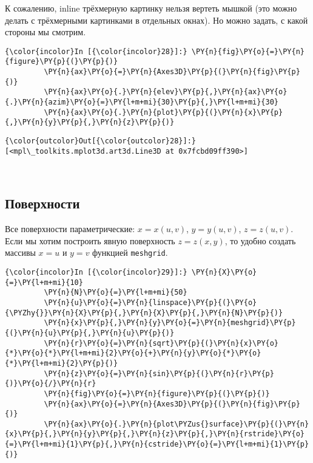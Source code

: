    К сожалению, inline трёхмерную картинку нельзя вертеть мышкой (это можно
делать с трёхмерными картинками в отдельных окнах). Но можно задать, с
какой стороны мы смотрим.

    \begin{Verbatim}[commandchars=\\\{\}]
{\color{incolor}In [{\color{incolor}28}]:} \PY{n}{fig}\PY{o}{=}\PY{n}{figure}\PY{p}{(}\PY{p}{)}
         \PY{n}{ax}\PY{o}{=}\PY{n}{Axes3D}\PY{p}{(}\PY{n}{fig}\PY{p}{)}
         \PY{n}{ax}\PY{o}{.}\PY{n}{elev}\PY{p}{,}\PY{n}{ax}\PY{o}{.}\PY{n}{azim}\PY{o}{=}\PY{l+m+mi}{30}\PY{p}{,}\PY{l+m+mi}{30}
         \PY{n}{ax}\PY{o}{.}\PY{n}{plot}\PY{p}{(}\PY{n}{x}\PY{p}{,}\PY{n}{y}\PY{p}{,}\PY{n}{z}\PY{p}{)}
\end{Verbatim}

            \begin{Verbatim}[commandchars=\\\{\}]
{\color{outcolor}Out[{\color{outcolor}28}]:} [<mpl\_toolkits.mplot3d.art3d.Line3D at 0x7fcbd09ff390>]
\end{Verbatim}
        
    \begin{center}
    \end{center}
    { \hspace*{\fill} \\}
    
\subsection{Поверхности}
\label{matplotlib9}

Все поверхности параметрические: \(x=x(u,v)\), \(y=y(u,v)\),
\(z=z(u,v)\). Если мы хотим построить явную поверхность \(z=z(x,y)\), то
удобно создать массивы \(x=u\) и \(y=v\) функцией \texttt{meshgrid}.

    \begin{Verbatim}[commandchars=\\\{\}]
{\color{incolor}In [{\color{incolor}29}]:} \PY{n}{X}\PY{o}{=}\PY{l+m+mi}{10}
         \PY{n}{N}\PY{o}{=}\PY{l+m+mi}{50}
         \PY{n}{u}\PY{o}{=}\PY{n}{linspace}\PY{p}{(}\PY{o}{\PYZhy{}}\PY{n}{X}\PY{p}{,}\PY{n}{X}\PY{p}{,}\PY{n}{N}\PY{p}{)}
         \PY{n}{x}\PY{p}{,}\PY{n}{y}\PY{o}{=}\PY{n}{meshgrid}\PY{p}{(}\PY{n}{u}\PY{p}{,}\PY{n}{u}\PY{p}{)}
         \PY{n}{r}\PY{o}{=}\PY{n}{sqrt}\PY{p}{(}\PY{n}{x}\PY{o}{*}\PY{o}{*}\PY{l+m+mi}{2}\PY{o}{+}\PY{n}{y}\PY{o}{*}\PY{o}{*}\PY{l+m+mi}{2}\PY{p}{)}
         \PY{n}{z}\PY{o}{=}\PY{n}{sin}\PY{p}{(}\PY{n}{r}\PY{p}{)}\PY{o}{/}\PY{n}{r}
         \PY{n}{fig}\PY{o}{=}\PY{n}{figure}\PY{p}{(}\PY{p}{)}
         \PY{n}{ax}\PY{o}{=}\PY{n}{Axes3D}\PY{p}{(}\PY{n}{fig}\PY{p}{)}
         \PY{n}{ax}\PY{o}{.}\PY{n}{plot\PYZus{}surface}\PY{p}{(}\PY{n}{x}\PY{p}{,}\PY{n}{y}\PY{p}{,}\PY{n}{z}\PY{p}{,}\PY{n}{rstride}\PY{o}{=}\PY{l+m+mi}{1}\PY{p}{,}\PY{n}{cstride}\PY{o}{=}\PY{l+m+mi}{1}\PY{p}{)}
\end{Verbatim}

